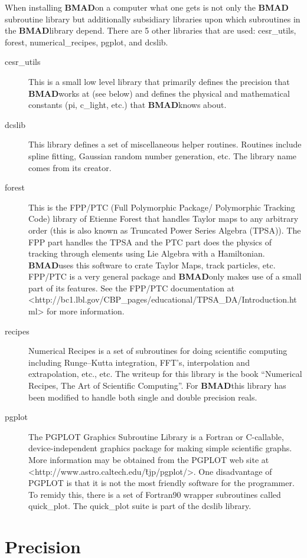 \documentclass{book}
\newcommand{\bmad}{{\bf BMAD}}
\begin{document}
When installing \bmad on a computer what one gets is not only the \bmad
subroutine library but additionally subsidiary libraries upon which
subroutines in the \bmad library depend. There are 5 other libraries
that are used: cesr\_utils, forest, numerical\_recipes, pgplot, and dcslib.
\begin{description}
\item[cesr\_utils] This is a small low level library that primarily defines 
the precision that \bmad works at (see below) and defines the physical
and mathematical constants (pi, c\_light, etc.) that \bmad knows
about.
\item[dcslib] This library defines a set of miscellaneous helper routines. 
Routines include spline fitting, Gaussian random number generation,
etc. The library name comes from its creator.
\item[forest] This is the FPP/PTC 
(Full Polymorphic Package/ Polymorphic Tracking Code) library of
Etienne Forest that handles Taylor maps to any arbitrary order (this
is also known as Truncated Power Series Algebra (TPSA)). The FPP part
handles the TPSA and the PTC part does the physics of tracking through
elements using Lie Algebra with a Hamiltonian.  \bmad uses this
software to crate Taylor Maps, track particles, etc.  FPP/PTC is a
very general package and \bmad only makes use of a small part of its
features. See the FPP/PTC documentation at
<http://bc1.lbl.gov/CBP\_pages/educational/TPSA\_DA/Introduction.html>
for more information.
\item[recipes] Numerical Recipes is a set of subroutines for doing 
scientific computing including Runge--Kutta integration, FFT's,
interpolation and extrapolation, etc., etc. The writeup for this
library is the book ``Numerical Recipes, The Art of Scientific
Computing''\cite{?}. For \bmad this library has been modified to handle
both single and double precision reals.
\item[pgplot] The PGPLOT Graphics Subroutine Library is a Fortran or 
C-callable, device-independent graphics package for making simple
scientific graphs. More information may be obtained from the PGPLOT
web site at <http://www.astro.caltech.edu/\~tjp/pgplot/>. One
disadvantage of PGPLOT is that it is not the most friendly software
for the programmer. To remidy this, there is a set of Fortran90
wrapper subroutines called quick\_plot. The quick\_plot suite is part
of the dcslib library.
\end{description}

\section{Precision}
\end{document}
